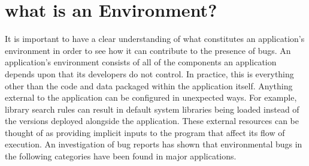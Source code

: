 \section{what is an Environment?}
\label{SEC:background}

It is important
to have a clear understanding
of what constitutes an application's environment
in order to see how it can contribute to the presence of bugs.
An application's environment consists of
all of the components an application depends upon
that its developers do not control.
In practice, this is everything other than the code and data packaged
within the application itself.
Anything external to the application can be
configured in unexpected ways.
For example, library search rules can result in default system libraries
being loaded instead of
the versions deployed alongside the application.
These external resources can be thought of as
providing implicit inputs to the program that affect its flow of execution.
An investigation of bug reports has shown that environmental bugs in the
following categories have been found in major applications.


